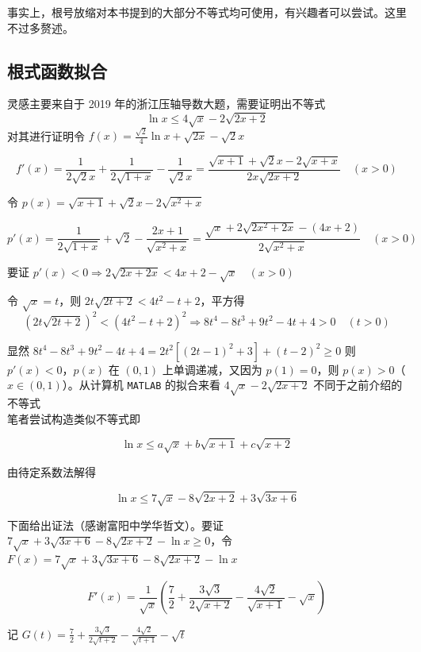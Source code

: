 \documentclass[12pt]{article}
\theoremstyle{definition}
\theoremstyle{plain}
\theoremstyle{definition}
\begin{document}
事实上，根号放缩对本书提到的大部分不等式均可使用，有兴趣者可以尝试。这里不过多赘述。

\subsection{根式函数拟合}

灵感主要来自于 2019 年的浙江压轴导数大题，需要证明出不等式
\[
\ln x \leq 4\sqrt{x} - 2\sqrt{2x+2}
\]
对其进行证明令
\(f(x) = \frac{\sqrt{2}}{4}\ln x + \sqrt{2x} - \sqrt{2}x\)

\[f'(x) = \frac{1}{2\sqrt{2}x} + \frac{1}{2\sqrt{1 + x}} - \frac{1}{\sqrt{2}x} = \frac{\sqrt{x + 1} + \sqrt{2}x - 2\sqrt{x + x}}{2x\sqrt{2x + 2}}\quad(x > 0)\]

令 \(p(x) = \sqrt{x + 1} + \sqrt{2}x - 2\sqrt{x^{2} + x}\)

\[p'(x) = \frac{1}{2\sqrt{1 + x}} + \sqrt{2} - \frac{2x + 1}{\sqrt{x^{2} + x}} = \frac{\sqrt{x} + 2\sqrt{2x^{2} + 2x} - (4x + 2)}{2\sqrt{x^{2} + x}}\quad(x > 0)\]

要证
\(p'(x) < 0 \Rightarrow 2\sqrt{2x + 2x} < 4x + 2 - \sqrt{x}\quad(x > 0)\)

令 \(\sqrt{x} = t\)，则 \(2t\sqrt{2t + 2} < 4t^{2} - t + 2\)，平方得
\[\left( 2t\sqrt{2t + 2} \right)^{2} < \left( 4t^{2} - t + 2 \right)^{2} \Rightarrow 8t^{4} - 8t^{3} + 9t^{2} - 4t + 4 > 0\quad(t > 0)\]

显然 \(8t^{4} - 8t^{3} + 9t^{2} - 4t + 4 = 2t^{2}\left\lbrack (2t - 1)^{2} + 3 \right\rbrack + (t - 2)^{2} \geq 0\)
则 \(p'(x) < 0\)，\(p(x)\) 在 \((0,1)\) 上单调递减，又因为 \(p(1) = 0\)，则
\(p(x) > 0\)（\(x \in (0,1)\)）。从计算机 \texttt{MATLAB} 的拟合来看
\(4\sqrt{x} - 2\sqrt{2x + 2}\) 不同于之前介绍的不等式\\
笔者尝试构造类似不等式即

\[\ln x \leq a\sqrt{x} + b\sqrt{x + 1} + c\sqrt{x + 2}\]

由待定系数法解得

\[\ln x \leq 7\sqrt{x} - 8\sqrt{2x + 2} + 3\sqrt{3x + 6}\]

下面给出证法（感谢富阳中学华哲文）。要证
\(7\sqrt{x} + 3\sqrt{3x + 6} - 8\sqrt{2x + 2} - \ln x \geq 0\)，令
\(F(x) = 7\sqrt{x} + 3\sqrt{3x + 6} - 8\sqrt{2x + 2} - \ln x\)

\[F'(x) = \frac{1}{\sqrt{x}}\left( \frac{7}{2} + \frac{3\sqrt{3}}{2\sqrt{x + 2}} - \frac{4\sqrt{2}}{\sqrt{x + 1}} - \sqrt{x} \right)\]

记
\(G(t) = \frac{7}{2} + \frac{3\sqrt{3}}{2\sqrt{t + 2}} - \frac{4\sqrt{2}}{\sqrt{t + 1}} - \sqrt{t}\)
\end{document}
